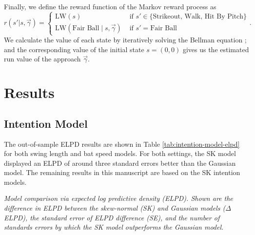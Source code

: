 \documentclass[
  12pt]{article}
\begin{document}
      Finally, we define the reward function of the Markov reward process as
      \begin{equation*}
          r(s' | s, \vec\gamma) = \begin{cases}
            \mbox{LW}(s) & \mbox{ if } s' \in \{\mbox{Strikeout, Walk, Hit By Pitch}\}\\
            \mbox{LW}(\mbox{Fair Ball} \mid s, \vec\gamma) & \mbox{ if } s' = \mbox{Fair Ball}
          \end{cases}.
      \end{equation*}
      We calculate the value of each state by iteratively solving the Bellman equation \citep{bellman_dynamic_1957}; and the corresponding value of the initial state $s = (0, 0)$ gives us the estimated run value of the approach $\vec\gamma$.

  \section{Results}
  \label{sec:results}
  

    \subsection{Intention Model}
    \label{sec:results-intention}

      The out-of-sample ELPD results are shown in Table \ref{tab:intention-model-elpd} for both swing length and bat speed models. For both settings, the SK model displayed an ELPD of around three standard errors better than the Gaussian model. The remaining results in this manuscript are based on the SK intention models.

      \begin{table}[H]
        \centering
        
        \caption{\it Model comparison via expected log predictive density (ELPD). Shown are the difference in ELPD between the skew-normal (SK) and Gaussian models ($\Delta$ELPD), the standard error of ELPD difference (SE), and the number of standards errors by which the SK model outperforms the Gaussian model.}
        \label{tab:intention-model-elpd}
      \end{table}
\end{document}
